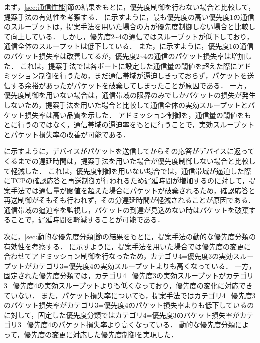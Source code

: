 \documentclass[a4paper,11pt,uplatex]{ujreport}
\begin{document}
  まず，\ref{sec:通信性能}節の結果をもとに，優先度制御を行わない場合と比較して，提案手法の有効性を考察する．
  に示すように，最も優先度の高い優先度1の通信のスループットは，提案手法を用いた場合の方が優先度制御しない場合と比較して向上している．
  しかし，優先度2\textasciitilde4の通信ではスループットが低下しており，通信全体のスループットは低下している．
  また，に示すように，優先度1の通信のパケット損失率は改善してるが，優先度2\textasciitilde4の通信のパケット損失率は増加した．
  これは，提案手法では各ポートに設定した通信量の閾値を超えた際にアドミッション制御を行うため，まだ通信帯域が逼迫しきっておらず，パケットを送信する余裕があったがパケットを破棄してしまったことが原因である．
  一方，優先度制御を用いない場合は，通信帯域の限界のみでしかパケットの損失が発生しないため，提案手法を用いた場合と比較して通信全体の実効スループットとパケット損失率は高い品質を示した．
  アドミッション制御を，通信量の閾値をもとに行うのではなく，通信帯域の逼迫率をもとに行うことで，実効スループットとパケット損失率の改善が可能である．\par

  に示すように，デバイスがパケットを送信してからその応答がデバイスに返ってくるまでの遅延時間は，提案手法を用いた場合が優先度制御しない場合と比較して軽減した．
  これは，優先度制御を用いない場合では，通信帯域が逼迫した際にTCPの確認応答と再送制御が行われるため遅延時間が増加するのに対して，提案手法では通信量が閾値を超えた場合にパケットが破棄されるため，確認応答と再送制御がそもそも行われず，その分遅延時間が軽減されることが原因である．
  通信帯域の逼迫率を監視し，パケットの到達が見込めない時はパケットを破棄することで，遅延時間を軽減することが可能である．\par

  次に，\ref{sec:動的な優先度分類}節の結果をもとに，提案手法の動的な優先度分類の有効性を考察する．
  に示すように，提案手法を用いた場合では優先度の変更に合わせてアドミッション制御を行なったため，カテゴリ4=優先度3の実効スループットがカテゴリ3=優先度4の実効スループットよりも高くなっている．
  一方，固定された優先度分類では，カテゴリ4=優先度3の実効スループットがカテゴリ3=優先度4の実効スループットよりも低くなっており，優先度の変化に対応できていない．
  また，パケット損失率についても，提案手法ではカテゴリ4=優先度3のパケット損失率がカテゴリ3=優先度4のパケット損失率よりも低下しているのに対して，固定した優先度分類ではカテゴリ4=優先度3のパケット損失率がカテゴリ3=優先度4のパケット損失率より高くなっている．
  動的な優先度分類によって，優先度の変更に対応した優先度制御を実現した．\par
\end{document}
